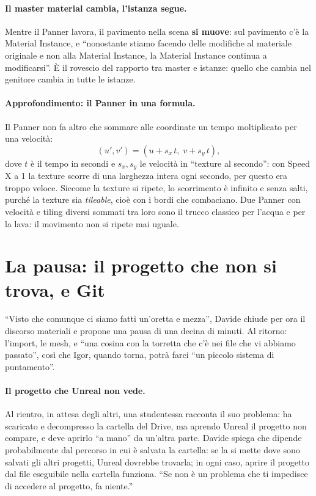 \paragraph{Il master material cambia, l'istanza segue.} Mentre il Panner lavora, il
pavimento nella scena \textbf{si muove}: sul pavimento c'è la Material Instance, e
``nonostante stiamo facendo delle modifiche al materiale originale e non alla Material
Instance, la Material Instance continua a modificarsi''. È il rovescio del rapporto tra
master e istanze: quello che cambia nel genitore cambia in tutte le istanze.

\paragraph{Approfondimento: il Panner in una formula.} Il Panner non fa altro che
sommare alle coordinate un tempo moltiplicato per una velocità:
\[
  (u', v') = (u + s_x\,t,\; v + s_y\,t),
\]
dove $t$ è il tempo in secondi e $s_x, s_y$ le velocità in ``texture al secondo'': con
Speed X a 1 la texture scorre di una larghezza intera ogni secondo, per questo era
troppo veloce. Siccome la texture si ripete, lo scorrimento è infinito e senza salti,
purché la texture sia \emph{tileable}, cioè con i bordi che combaciano. Due Panner con
velocità e tiling diversi sommati tra loro sono il trucco classico per l'acqua e per la
lava: il movimento non si ripete mai uguale.

\section{La pausa: il progetto che non si trova, e Git}
\label{ue3:sec:pausa}

``Visto che comunque ci siamo fatti un'oretta e mezza'', Davide chiude per ora il
discorso materiali e propone una pausa di una decina di minuti. Al ritorno: l'import,
le mesh, e ``una cosina con la torretta che c'è nei file che vi abbiamo passato'', così
che Igor, quando torna, potrà farci ``un piccolo sistema di puntamento''.

\paragraph{Il progetto che Unreal non vede.} Al rientro, in attesa degli altri, una
studentessa racconta il suo problema: ha scaricato e decompresso la cartella del Drive,
ma aprendo Unreal il progetto non compare, e deve aprirlo ``a mano'' da un'altra parte.
Davide spiega che dipende probabilmente dal percorso in cui è salvata la cartella: se la
si mette dove sono salvati gli altri progetti, Unreal dovrebbe trovarla; in ogni caso,
aprire il progetto dal file eseguibile nella cartella funziona. ``Se non è un problema
che ti impedisce di accedere al progetto, fa niente.''

